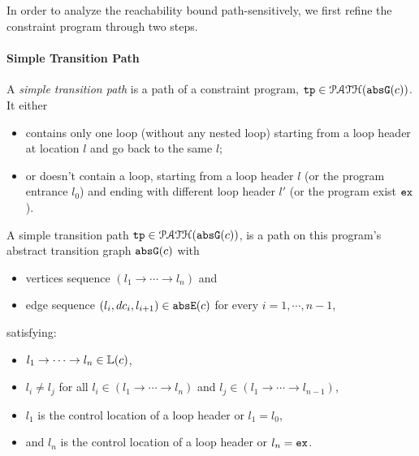 \subsection{}
\label{sec:pathsensitive_rb-refine}
In order to analyze the reachability bound path-sensitively, we first refine the constraint program through two steps.
%
  \paragraph{Simple Transition Path}
%
A \emph{simple transition path} is a path of a constraint program, $\mathtt{tp} \in \mathcal{PATH}(\mathtt{abs}{\mathtt{G}}(c))$.
It either
\begin{itemize}
  \item contains only one loop (without any nested loop) starting from a loop header at location $l$ and go back to the same $l$;
  \item or doesn't contain a loop, starting from a loop header $l$ (or the program entrance $l_0$)
and ending with different loop header $l'$ (or the program exist $\mathtt{ex}$).
\end{itemize}
  \begin{defn}
  A simple transition path
  $\mathtt{tp} \in \mathcal{PATH}(\mathtt{abs}{\mathtt{G}}(c))$, is a path on this program's abstract transition graph $\mathtt{abs}{\mathtt{G}}(c)$ with 
  \begin{itemize}
  \item vertices sequence $(l_1 \to \cdots \to l_n)$ and
  \item edge sequence $(l_i, dc_i, l_{i + 1}) \in \mathtt{abs}{\mathtt{E}}(c)$ for every $i = 1, \cdots, n-1$,
  \end{itemize}
  satisfying:
  \begin{itemize}
    \item $l_1 \to \cdots \to l_n \in \mathbb{L}(c)$,
    \item $l_i \neq l_j$ for all $l_i\in (l_1 \to \cdots \to l_{n})$ and $l_j \in (l_1 \to \cdots \to l_{n - 1})$,
    \item $l_1$ is the control location of a loop header or $l_1 = l_0$,
    \item and $l_n$ is the control location of a loop header or $l_n = \mathtt{ex}$.
  \end{itemize}
  \end{defn}


